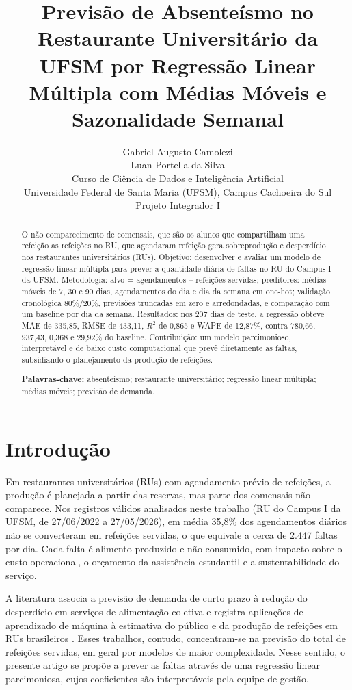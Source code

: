 \documentclass[11pt]{article}
\title{\large Previsão de Absenteísmo no
Restaurante Universitário da UFSM
por Regressão Linear Múltipla
com Médias Móveis e Sazonalidade Semanal}
\author{Gabriel Augusto Camolezi\\
Luan Portella da Silva\\
\small Curso de Ciência de Dados e Inteligência Artificial\\
\small Universidade Federal de Santa Maria (UFSM), Campus Cachoeira do Sul\\
\small Projeto Integrador I}
\date{}
\begin{document}
\maketitle

\begin{abstract}
O não comparecimento de comensais, que são os alunos que compartilham uma refeição as refeições no RU, que agendaram refeição gera sobreprodução e desperdício nos restaurantes universitários (RUs). Objetivo: desenvolver e avaliar um modelo de regressão linear múltipla para prever a quantidade diária de faltas no RU do Campus I da UFSM. Metodologia: alvo = agendamentos -- refeições servidas; preditores: médias móveis de 7, 30 e 90 dias, agendamentos do dia e dia da semana em one-hot; validação cronológica 80\%/20\%, previsões truncadas em zero e arredondadas, e comparação com um baseline por dia da semana. Resultados: nos 207 dias de teste, a regressão obteve MAE de 335,85, RMSE de 433,11, $R^2$ de 0,865 e WAPE de 12,87\%, contra 780,66, 937,43, 0,368 e 29,92\% do baseline. Contribuição: um modelo parcimonioso, interpretável e de baixo custo computacional que prevê diretamente as faltas, subsidiando o planejamento da produção de refeições.

\textbf{Palavras-chave:} absenteísmo; restaurante universitário; regressão linear múltipla; médias móveis; previsão de demanda.
\end{abstract}

\section{Introdução}

Em restaurantes universitários (RUs) com agendamento prévio de refeições, a produção é planejada a partir das reservas, mas parte dos comensais não comparece. Nos registros válidos analisados neste trabalho (RU do Campus I da UFSM, de 27/06/2022 a 27/05/2026), em média 35,8\% dos agendamentos diários não se converteram em refeições servidas, o que equivale a cerca de 2.447 faltas por dia. Cada falta é alimento produzido e não consumido, com impacto sobre o custo operacional, o orçamento da assistência estudantil e a sustentabilidade do serviço.

A literatura associa a previsão de demanda de curto prazo à redução do desperdício em serviços de alimentação coletiva \citep{rodrigues2024machine} e registra aplicações de aprendizado de máquina à estimativa do público e da produção de refeições em RUs brasileiros \citep{rocha2011utilizaccao,de2021metodo}. Esses trabalhos, contudo, concentram-se na previsão do total de refeições servidas, em geral por modelos de maior complexidade. Nesse sentido, o presente artigo se propõe a prever as faltas através de uma regressão linear parcimoniosa, cujos coeficientes são interpretáveis pela equipe de gestão.
\end{document}
